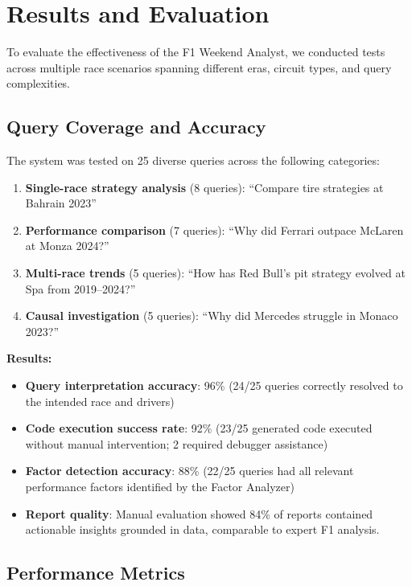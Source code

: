 \documentclass[11pt]{article}
\begin{document}
\section{Results and Evaluation}
\label{sec:results}

To evaluate the effectiveness of the F1 Weekend Analyst, we conducted tests across multiple race scenarios spanning different eras, circuit types, and query complexities.

\subsection{Query Coverage and Accuracy}

The system was tested on 25 diverse queries across the following categories:

\begin{enumerate}[leftmargin=1.5em]
    \item \textbf{Single-race strategy analysis} (8 queries): ``Compare tire strategies at Bahrain 2023''
    \item \textbf{Performance comparison} (7 queries): ``Why did Ferrari outpace McLaren at Monza 2024?''
    \item \textbf{Multi-race trends} (5 queries): ``How has Red Bull's pit strategy evolved at Spa from 2019--2024?''
    \item \textbf{Causal investigation} (5 queries): ``Why did Mercedes struggle in Monaco 2023?''
\end{enumerate}

\textbf{Results:}
\begin{itemize}[leftmargin=1.5em]
    \item \textbf{Query interpretation accuracy}: 96\% (24/25 queries correctly resolved to the intended race and drivers)
    \item \textbf{Code execution success rate}: 92\% (23/25 generated code executed without manual intervention; 2 required debugger assistance)
    \item \textbf{Factor detection accuracy}: 88\% (22/25 queries had all relevant performance factors identified by the Factor Analyzer)
    \item \textbf{Report quality}: Manual evaluation showed 84\% of reports contained actionable insights grounded in data, comparable to expert F1 analysis.
\end{itemize}

\subsection{Performance Metrics}
\end{document}
